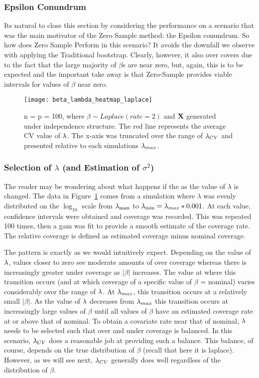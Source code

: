 \subsubsection{Epsilon Conundrum}\label{Sec:Epsilon}

Its natural to close this section by considering the performance on a scenario that was the main motivator of the Zero Sample method: the Epsilon conundrum. So how does Zero Sample Perform in this scenario? It avoids the downfall we observe with applying the Traditional bootstrap. Clearly, however, it also over covers due to the fact that the large majority of $\beta$s are near zero, but, again, this is to be expected and the important take away is that Zero-Sample provides viable intervals for values of $\beta$ near zero.

\begin{figure}[hbtp]
  \texttt{[image: beta\_lambda\_heatmap\_laplace]}
  \caption{\label{Fig:beta_lambda_heatmap_laplace} n = p = 100, where $\beta \sim Laplace(rate = 2)$ and $\mathbf{X}$ generated under independence structure. The red line represents the average CV value of $\lambda$. The x-axis was truncated over the range of $\lambda_{CV}$ and presented relative to each simulations $\lambda_{max}$.}
\end{figure}

\subsubsection{Selection of \texorpdfstring{$\lambda$}{lambda} (and Estimation of \texorpdfstring{$\sigma^2$}{sigma squared})}

The reader may be wondering about what happens if the as the value of $\lambda$ is changed. The data in Figure~\ref{Fig:beta_lambda_heatmap_laplace} comes from a simulation where $\lambda$ was evenly distributed on the $\log_{10}$ scale from $\lambda_{\max}$ to $\lambda_{\min} = \lambda_{max} * 0.001$. At each value, confidence intervals were obtained and coverage was recorded. This was repeated 100 times, then a gam was fit to provide a smooth estimate of the coverage rate. The relative coverage is defined as estimated coverage minus nominal coverage.

The pattern is exactly as we would intuitively expect. Depending on the value of $\lambda$, values closer to zero see moderate amounts of over coverage whereas there is increasingly greater under coverage as $|\beta|$ increases. The value at where this transition occurs (and at which coverage of a specific value of $\beta$ = nominal) varies considerably over the range of $\lambda$. At $\lambda_{max}$, this transition occurs at a relatively small $|\beta|$. As the value of $\lambda$ decreases from $\lambda_{max}$ this transition occurs at increasingly large values of $\beta$ until all values of $\beta$ have an estimated coverage rate at or above that of nominal. To obtain a covariate rate near that of nominal, $\lambda$ needs to be selected such that over and under coverage is balanced. In this scenario, $\lambda_{CV}$ does a reasonable job at providing such a balance. This balance, of course, depends on the true distribution of $\beta$ (recall that here it is laplace). However, as we will see next, $\lambda_{CV}$ generally does well regardless of the distribution of $\beta$.


